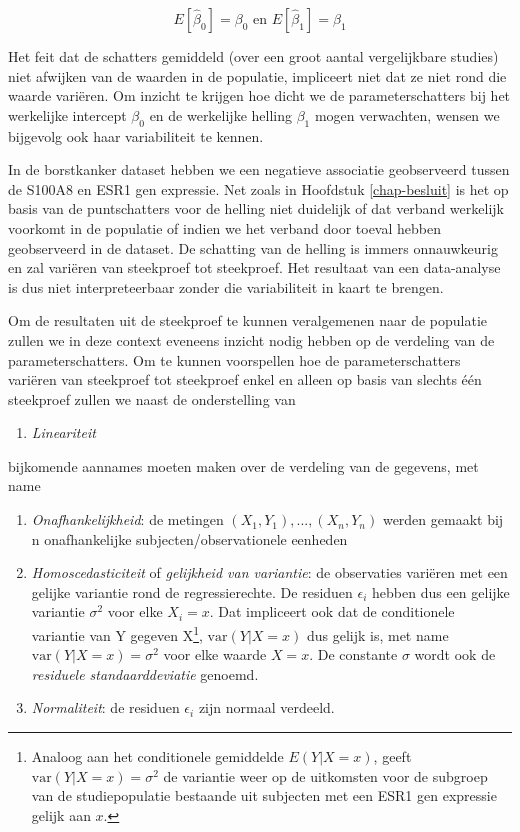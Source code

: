 \documentclass[
  12pt,dutch]{book}
\providecommand{\tightlist}{%
  \setlength{\itemsep}{0pt}\setlength{\parskip}{0pt}}
\theoremstyle{definition}
\theoremstyle{definition}
\theoremstyle{definition}
\theoremstyle{definition}
\theoremstyle{remark}
\begin{document}
\[E[\hat \beta_0]=\beta_0 \text{ en } E[\hat \beta_1]=\beta_1\]

Het feit dat de schatters gemiddeld (over een groot aantal vergelijkbare studies) niet afwijken van de waarden in de populatie, impliceert niet dat ze niet rond die waarde variëren.
Om inzicht te krijgen hoe dicht we de parameterschatters bij het werkelijke intercept \(\beta_0\) en de werkelijke helling \(\beta_1\) mogen verwachten, wensen we bijgevolg ook haar variabiliteit te kennen.

In de borstkanker dataset hebben we een negatieve associatie geobserveerd tussen de S100A8 en ESR1 gen expressie.
Net zoals in Hoofdstuk \ref{chap-besluit} is het op basis van de puntschatters voor de helling niet duidelijk of dat verband werkelijk voorkomt in de populatie of indien we het verband door toeval hebben geobserveerd in de dataset.
De schatting van de helling is immers onnauwkeurig en zal variëren van steekproef tot steekproef.
Het resultaat van een data-analyse is dus niet interpreteerbaar zonder die variabiliteit in kaart te brengen.

Om de resultaten uit de steekproef te kunnen veralgemenen naar de populatie zullen we in deze context eveneens inzicht nodig hebben op de verdeling van de parameterschatters.
Om te kunnen voorspellen hoe de parameterschatters variëren van steekproef tot steekproef enkel en alleen op basis van slechts één steekproef zullen we naast de onderstelling van

\begin{enumerate}
\def\labelenumi{\arabic{enumi}.}
\tightlist
\item
  \emph{Lineariteit}
\end{enumerate}

bijkomende aannames moeten maken over de verdeling van de gegevens, met name

\begin{enumerate}
\def\labelenumi{\arabic{enumi}.}
\setcounter{enumi}{1}
\tightlist
\item
  \emph{Onafhankelijkheid}: de metingen \((X_1,Y_1), ...,  (X_n,Y_n)\) werden gemaakt bij n onafhankelijke subjecten/observationele eenheden
\item
  \emph{Homoscedasticiteit} of \emph{gelijkheid van variantie}: de observaties variëren met een gelijke variantie rond de regressierechte. De residuen \(\epsilon_i\) hebben dus een gelijke variantie \(\sigma^2\) voor elke \(X_i=x\). Dat impliceert ook dat de conditionele variantie van Y gegeven X\footnote{Analoog aan het conditionele
    gemiddelde \(E(Y|X=x)\), geeft \(\text{var}(Y\vert X=x) = \sigma^2\) de variantie weer op de uitkomsten voor de subgroep van de studiepopulatie bestaande uit subjecten met een ESR1 gen expressie gelijk aan \(x\).}, \(\text{var}(Y\vert X=x)\) dus gelijk is, met name \(\text{var}(Y\vert X=x) = \sigma^2\) voor elke waarde \(X=x\). De constante \(\sigma\) wordt ook de \emph{residuele standaarddeviatie} genoemd.
\item
  \emph{Normaliteit}: de residuen \(\epsilon_i\) zijn normaal verdeeld.
\end{enumerate}
\end{document}
